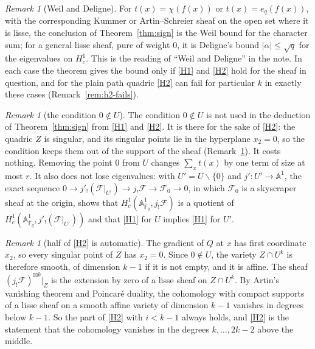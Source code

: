 \documentclass[11pt]{amsbook}
\theoremstyle{plain}
\theoremstyle{definition}
\theoremstyle{remark}
\newtheorem{remark}[theorem]{Remark}
\numberwithin{equation}{section}
\numberwithin{figure}{chapter}
\numberwithin{table}{chapter}
\newcommand{\F}{\mathbb{F}}
\newcommand{\Fb}{\overline{\F}_q}
\newcommand{\cF}{\mathcal{F}}
\begin{document}
\begin{remark}[Weil and Deligne]\label{rem:weil-deligne}
For $t(x)=\chi(f(x))$ or $t(x)=e_q(f(x))$, with the corresponding
Kummer or Artin--Schreier sheaf on the open set where it is lisse,
the conclusion of Theorem~\ref{thm:sign} is the Weil bound for the
character sum; for a general lisse sheaf, pure of weight $0$, it is
Deligne's bound $|\alpha|\le\sqrt q$ for the eigenvalues on
$H^1_c$. This is the reading of ``Weil and Deligne'' in the note.
In each case the theorem gives the bound only if \ref{H1} and
\ref{H2} hold for the sheaf in question, and for the plain path
quadric \ref{H2} can fail for particular $k$ in exactly these
cases (Remark~\ref{rem:h2-fails}).
\end{remark}

\begin{remark}[the condition $0\notin U$]\label{rem:origin}
The condition $0 \notin U$ is not used in the deduction of
Theorem~\ref{thm:sign} from \ref{H1} and \ref{H2}. It is there for
the sake of \ref{H2}: the quadric $Z$ is singular, and its singular
points lie in the hyperplane $x_2=0$, so the condition keeps them
out of the support of the sheaf (Remark~\ref{rem:h2-half}). It
costs nothing. Removing the point $0$ from $U$ changes
$\sum_xt(x)$ by one term of size at most $r$. It also does not
lose eigenvalues: with $U'=U\smallsetminus\{0\}$ and
$j'\colon U'\to\mathbb A^1$, the exact sequence
$0\to j'_!(\cF|_{U'})\to j_!\cF\to\cF_0\to0$, in which $\cF_0$ is
a skyscraper sheaf at the origin, shows that
$H^1_c(\mathbb A^1_{\Fb},j_!\cF)$ is a quotient of
$H^1_c(\mathbb A^1_{\Fb},j'_!(\cF|_{U'}))$ and that \ref{H1} for
$U$ implies \ref{H1} for $U'$.
\end{remark}

\begin{remark}[half of \ref{H2} is automatic]\label{rem:h2-half}
The gradient of $Q$ at $x$ has first coordinate $x_2$, so every
singular point of $Z$ has $x_2=0$. Since $0\notin U$, the variety
$Z\cap U^k$ is therefore smooth, of dimension $k-1$ if it is not
empty, and it is affine. The sheaf $(j_!\cF)^{\boxtimes k}|_Z$ is
the extension by zero of a lisse sheaf on $Z\cap U^k$. By Artin's
vanishing theorem and Poincar\'e duality, the cohomology with
compact supports of a lisse sheaf on a smooth affine variety of
dimension $k-1$ vanishes in degrees below $k-1$. So the part of
\ref{H2} with $i<k-1$ always holds, and \ref{H2} is the statement
that the cohomology vanishes in the degrees $k,\dots,2k-2$ above
the middle.
\end{remark}
\end{document}
